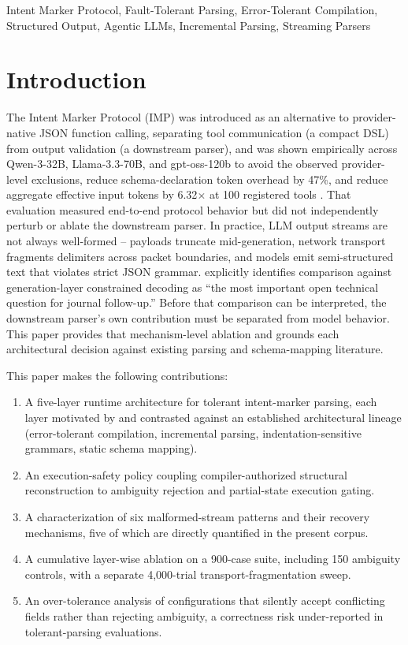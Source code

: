 \documentclass[conference]{IEEEtran}
\begin{document}
\begin{IEEEkeywords}
Intent Marker Protocol, Fault-Tolerant Parsing, Error-Tolerant Compilation, Structured Output, Agentic LLMs, Incremental Parsing, Streaming Parsers
\end{IEEEkeywords}

\section{Introduction}

The Intent Marker Protocol (IMP) was introduced as an alternative to
provider-native JSON function calling, separating tool communication
(a compact DSL) from output validation (a downstream parser), and was
shown empirically across Qwen-3-32B, Llama-3.3-70B, and gpt-oss-120b to
avoid the observed provider-level exclusions, reduce schema-declaration token overhead by 47\%,
and reduce aggregate effective input tokens by 6.32$\times$ at 100 registered
tools \cite{irai2026}. That evaluation measured end-to-end protocol behavior
but did not independently perturb or ablate the downstream parser. In
practice, LLM output streams are not always
well-formed -- payloads truncate mid-generation, network transport
fragments delimiters across packet boundaries, and models emit
semi-structured text that violates strict JSON grammar. \cite{irai2026}
explicitly identifies comparison against generation-layer constrained
decoding as ``the most important open technical question for journal
follow-up.'' Before that comparison can be interpreted, the downstream parser's
own contribution must be separated from model behavior. This paper provides
that mechanism-level ablation and grounds each architectural decision against
existing parsing and schema-mapping literature.

This paper makes the following contributions:
\begin{enumerate}
\item A five-layer runtime architecture for tolerant intent-marker
parsing, each layer motivated by and contrasted against an established
architectural lineage (error-tolerant compilation, incremental parsing,
indentation-sensitive grammars, static schema mapping).
\item An execution-safety policy coupling compiler-authorized structural
reconstruction to ambiguity rejection and partial-state execution gating.
\item A characterization of six malformed-stream patterns and their recovery
mechanisms, five of which are directly quantified in the present corpus.
\item A cumulative layer-wise ablation on a 900-case suite, including 150
ambiguity controls, with a separate 4,000-trial transport-fragmentation sweep.
\item An over-tolerance analysis of configurations that silently accept
conflicting fields rather than rejecting ambiguity, a correctness risk
under-reported in tolerant-parsing evaluations.
\end{enumerate}
\end{document}
